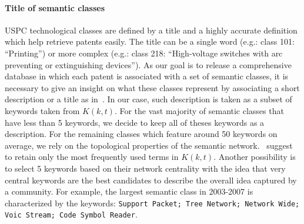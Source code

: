 \documentclass[10pt,A4,draft]{article}
\begin{document}
\paragraph*{Title of semantic classes}
USPC technological classes are defined by a title and a highly accurate definition which help retrieve patents easily. The title can be a single word (e.g.: class 101: ``Printing'') or more complex (e.g.: class 218: ``High-voltage switches with arc preventing or extinguishing devices''). As our goal is to release a comprehensive database in which each patent is associated with a set of semantic classes, it is necessary to give an insight on what these classes represent by associating a short description or a title as in~\cite{tseng2007text}. In our case, such description is taken as a subset of keywords taken from $K(k,t)$. For the vast majority of semantic classes that have less than 5 keywords, we decide to keep all of theses keywords as a description. For the remaining classes which feature around 50 keywords on average, we rely on the topological properties of the semantic network.~\cite{yang2000improving} suggest to retain only the most frequently used terms in $K(k,t)$. Another possibility is to select 5 keywords based on their network centrality with the idea that very central keywords are the best candidates to describe the overall idea captured by a community. For example, the largest semantic class in 2003-2007 is characterized by the keywords: \texttt{Support Packet; Tree Network; Network Wide; Voic Stream; Code Symbol Reader}.
\end{document}
